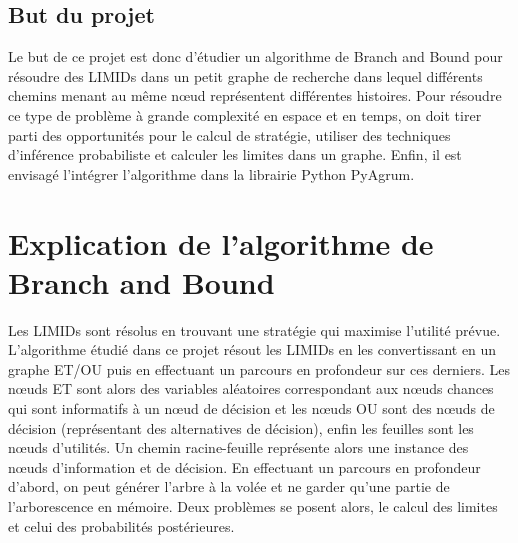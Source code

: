 \documentclass[12pt]{article}
\begin{document}
\subsection{But du projet}
Le but de ce projet est donc d'étudier un algorithme de Branch and Bound pour résoudre des LIMIDs dans un petit graphe de recherche dans lequel différents chemins menant au même nœud représentent différentes histoires. Pour résoudre ce type de problème à grande complexité en espace et en temps, on doit tirer parti des opportunités pour le calcul de stratégie, utiliser des techniques d'inférence probabiliste et calculer les limites dans un graphe.
Enfin, il est envisagé l'intégrer l'algorithme dans la librairie Python PyAgrum.

\section{Explication de l'algorithme de Branch and Bound}
Les LIMIDs sont résolus en trouvant une stratégie qui maximise l'utilité prévue.
L'algorithme étudié dans ce projet résout les LIMIDs en les convertissant en un graphe ET/OU puis en effectuant un parcours en profondeur sur ces derniers.
Les nœuds ET sont alors des variables aléatoires correspondant aux nœuds chances qui sont informatifs à un nœud de décision et les nœuds OU sont des nœuds de décision (représentant des alternatives de décision), enfin les feuilles sont les nœuds d'utilités.
Un chemin racine-feuille représente alors une instance des nœuds d'information et de décision.
En effectuant un parcours en profondeur d'abord, on peut générer l'arbre à la volée et ne garder qu'une partie de l'arborescence en mémoire.
Deux problèmes se posent alors, le calcul des limites et celui des probabilités postérieures.
\end{document}
